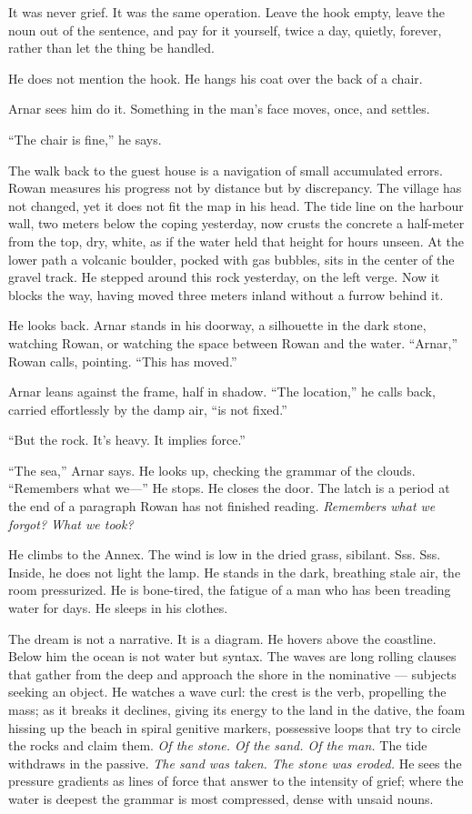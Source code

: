\documentclass[11pt,oneside]{book}
\newcommand{\sceneline}{%
  \par\vspace{1.2em}
  \begin{center}
    \fontsize{11}{11}\selectfont \textbullet\quad\textbullet\quad\textbullet
  \end{center}
  \vspace{0.6em}\noindent\ignorespaces
}
\begin{document}
It was never grief. It was the same operation. Leave the hook empty,
leave the noun out of the sentence, and pay for it yourself, twice a
day, quietly, forever, rather than let the thing be handled.

He does not mention the hook. He hangs his coat over the back of a
chair.

Arnar sees him do it. Something in the man's face moves, once, and
settles.

``The chair is fine,'' he says.

\sceneline

The walk back to the guest house is a navigation of small accumulated
errors. Rowan measures his progress not by distance but by discrepancy.
The village has not changed, yet it does not fit the map in his head.
The tide line on the harbour wall, two meters below the coping
yesterday, now crusts the concrete a half-meter from the top, dry,
white, as if the water held that height for hours unseen. At the lower
path a volcanic boulder, pocked with gas bubbles, sits in the center of
the gravel track. He stepped around this rock yesterday, on the left
verge. Now it blocks the way, having moved three meters inland without a
furrow behind it.

He looks back. Arnar stands in his doorway, a silhouette in the dark
stone, watching Rowan, or watching the space between Rowan and the
water. ``Arnar,'' Rowan calls, pointing. ``This has moved.''

Arnar leans against the frame, half in shadow. ``The location,'' he
calls back, carried effortlessly by the damp air, ``is not fixed.''

``But the rock. It's heavy. It implies force.''

``The sea,'' Arnar says. He looks up, checking the grammar of the
clouds. ``Remembers what we---'' He stops. He closes the door. The latch
is a period at the end of a paragraph Rowan has not finished reading.
\emph{Remembers what we forgot? What we took?}

He climbs to the Annex. The wind is low in the dried grass, sibilant.
Sss. Sss. Inside, he does not light the lamp. He stands in the dark,
breathing stale air, the room pressurized. He is bone-tired, the fatigue
of a man who has been treading water for days. He sleeps in his clothes.

The dream is not a narrative. It is a diagram. He hovers above the
coastline. Below him the ocean is not water but syntax. The waves are
long rolling clauses that gather from the deep and approach the shore in
the nominative --- subjects seeking an object. He watches a wave curl:
the crest is the verb, propelling the mass; as it breaks it declines,
giving its energy to the land in the dative, the foam hissing up the
beach in spiral genitive markers, possessive loops that try to circle
the rocks and claim them. \emph{Of the stone. Of the sand. Of the man.}
The tide withdraws in the passive. \emph{The sand was taken. The stone
was eroded.} He sees the pressure gradients as lines of force that
answer to the intensity of grief; where the water is deepest the grammar
is most compressed, dense with unsaid nouns.
\end{document}
